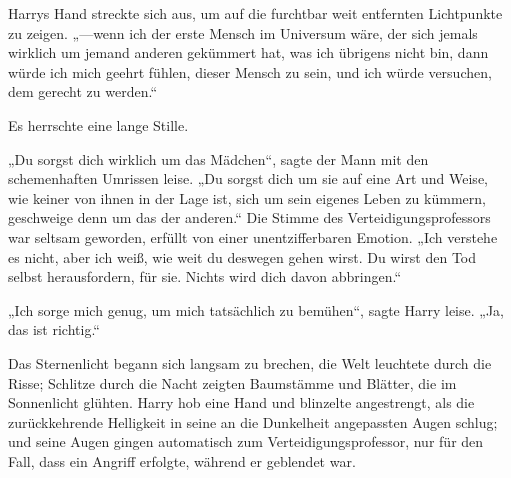 Harrys Hand streckte sich aus, um auf die furchtbar weit entfernten Lichtpunkte zu zeigen. „—wenn ich der erste Mensch im Universum wäre, der sich jemals wirklich um jemand anderen gekümmert hat, was ich übrigens nicht bin, dann würde ich mich geehrt fühlen, dieser Mensch zu sein, und ich würde versuchen, dem gerecht zu werden.“

Es herrschte eine lange Stille.

„Du sorgst dich wirklich um das Mädchen“, sagte der Mann mit den schemenhaften Umrissen leise. „Du sorgst dich um sie auf eine Art und Weise, wie keiner von ihnen in der Lage ist, sich um sein eigenes Leben zu kümmern, geschweige denn um das der anderen.“ Die Stimme des Verteidigungsprofessors war seltsam geworden, erfüllt von einer unentzifferbaren Emotion. „Ich verstehe es nicht, aber ich weiß, wie weit du deswegen gehen wirst. Du wirst den Tod selbst herausfordern, für sie. Nichts wird dich davon abbringen.“

„Ich sorge mich genug, um mich tatsächlich zu bemühen“, sagte Harry leise. „Ja, das ist richtig.“

Das Sternenlicht begann sich langsam zu brechen, die Welt leuchtete durch die Risse; Schlitze durch die Nacht zeigten Baumstämme und Blätter, die im Sonnenlicht glühten. Harry hob eine Hand und blinzelte angestrengt, als die zurückkehrende Helligkeit in seine an die Dunkelheit angepassten Augen schlug; und seine Augen gingen automatisch zum Verteidigungsprofessor, nur für den Fall, dass ein Angriff erfolgte, während er geblendet war.

